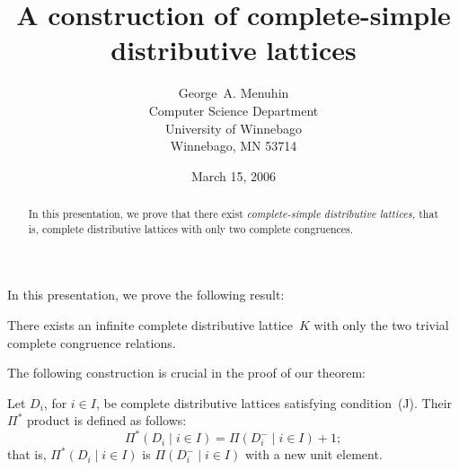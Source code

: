 \documentclass{foils}
\begin{document}
\title{A construction of complete-simple\\  
       distributive lattices}
\author{George~A. Menuhin\\
			Computer Science Department\\
         	University of Winnebago\\
         	Winnebago, MN 53714} 
\date{March 15, 2006}

\maketitle
\begin{abstract}
   In this presentation, we prove that there exist 
   \emph{complete-simple distributive lattices,} 
   that is, complete distributive lattices
   with only two complete congruences. 
\end{abstract}

In this presentation, we prove the following result:

\begin{Theorem} 
There exists an infinite complete distributive 
lattice~$K$ with only the two trivial complete 
congruence relations.
\end{Theorem}

The following construction is crucial in the proof
of our theorem:

\begin{Definition}\label{D:P*} 
Let $D_{i}$, for $i \in I$, be complete distributive 
lattices satisfying condition~\textup{(J)}.  Their 
$\Pi^{*}$ product is defined as follows:
\[
   \Pi^{*} ( D_{i} \mid i \in I ) = 
   \Pi ( D_{i}^{-} \mid i \in I ) + 1;
\]
that is, $\Pi^{*} ( D_{i} \mid i \in I )$ is 
$\Pi ( D_{i}^{-} \mid i \in I )$ with a new 
unit element. 
\end{Definition}

\foilhead{}
\end{document}
